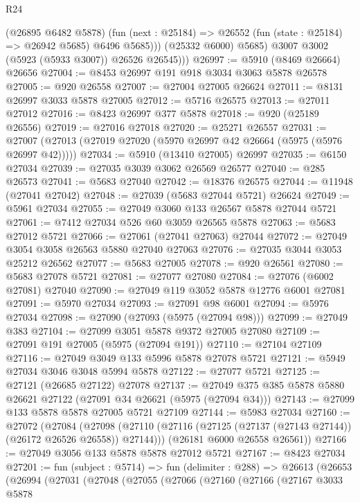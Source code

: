 \begin{lexlean}{R24}
\begin{coremodule}
                (@26895 @6482 @5878)
                (fun (next : @25184) => @26552 (fun (state : @25184) => @26942 @5685) @6496 @5685)))
            (@25332 @6000)
            @5685)
          @3007
          @3002
          (@5923 (@5933 @3007))
          @26526
          @26545)))
@26997 := @5910 (@8469 @26664) @26656
@27004 := @8453 @26997 @191 @918 @3034 @3063 @5878 @26578
@27005 := @920 @26558
@27007 := @27004 @27005 @26624
@27011 := @8131 @26997 @3033 @5878 @27005
@27012 := @5716 @26575
@27013 := @27011 @27012
@27016 := @8423 @26997 @377 @5878
@27018 := @920 (@25189 @26556)
@27019 := @27016 @27018
@27020 := @25271 @26557
@27031 := @27007 (@27013 (@27019 @27020 (@5970 @26997 @42 @26664 (@5975 (@5976 @26997 @42)))))
@27034 := @5910 (@13410 @27005) @26997
@27035 := @6150 @27034
@27039 := @27035 @3039 @3062 @26569 @26577
@27040 := @285 @26573
@27041 := @5683 @27040
@27042 := @18376 @26575
@27044 := @11948 (@27041 @27042)
@27048 := @27039 (@5683 @27044 @5721) @26624
@27049 := @5961 @27034
@27055 := @27049 @3060 @133 @26567 @5878 @27044 @5721
@27061 := @7412 @27034 @526 @60 @3059 @26565 @5878
@27063 := @5683 @27012 @5721
@27066 := @27061 (@27041 @27063) @27044
@27072 := @27049 @3054 @3058 @26563 @5880 @27040 @27063
@27076 := @27035 @3044 @3053 @25212 @26562
@27077 := @5683 @27005
@27078 := @920 @26561
@27080 := @5683 @27078 @5721
@27081 := @27077 @27080
@27084 := @27076 (@6002 @27081) @27040
@27090 := @27049 @119 @3052 @5878 @12776 @6001 @27081
@27091 := @5970 @27034
@27093 := @27091 @98 @6001
@27094 := @5976 @27034
@27098 := @27090 (@27093 (@5975 (@27094 @98)))
@27099 := @27049 @383
@27104 := @27099 @3051 @5878 @9372 @27005 @27080
@27109 := @27091 @191 @27005 (@5975 (@27094 @191))
@27110 := @27104 @27109
@27116 := @27049 @3049 @133 @5996 @5878 @27078 @5721
@27121 := @5949 @27034 @3046 @3048 @5994 @5878
@27122 := @27077 @5721
@27125 := @27121 (@26685 @27122) @27078
@27137 := @27049 @375 @385 @5878 @5880 @26621 @27122 (@27091 @34 @26621 (@5975 (@27094 @34)))
@27143 := @27099 @133 @5878 @5878 @27005 @5721 @27109
@27144 := @5983 @27034
@27160 := @27072
    (@27084
      (@27098 (@27110 (@27116 (@27125 (@27137 (@27143 @27144)) (@26172 @26526 @26558)) @27144)))
      (@26181 @6000 @26558 @26561))
@27166 := @27049 @3056 @133 @5878 @5878 @27012 @5721
@27167 := @8423 @27034
@27201 := fun (subject : @5714) =>
  fun (delimiter : @288) =>
  @26613
    (@26653
      (@26994
        (@27031
          (@27048
            (@27055
              (@27066
                (@27160
                  (@27166
                    (@27167
                      @3033
                      @5878

\end{coremodule}
\end{lexlean}
